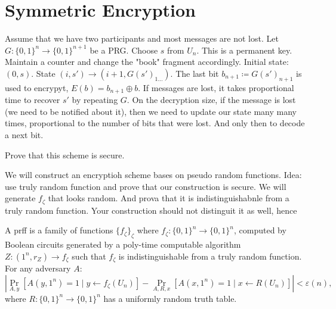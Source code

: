 

\section{Symmetric Encryption}

Assume that we have two participants and most messages are not lost.
Let $G \colon \{0, 1\}^{n} \to  \{0, 1\}^{n + 1}$ be a PRG.
Choose $s$ from $U_n$.
This is a permanent key.
Maintain a counter and change the "book" fragment accordingly.
Initial state:  $(0, s)$.
State $(i, s') \to (i + 1, G(s')_{1\ldots })$.
The last bit $b_{n + 1} \coloneqq G(s')_{n + 1}$ is used to encrypyt, $E(b) = b_{n + 1} \oplus b$.
If messages are lost, it takes proportional time to recover $s'$ by repeating  $G$.
On the decryption size, if the message is lost (we need to be notified about it), then we need to update our state many many times, proportional to the number of bits that were lost.
And only then to decode a next bit.
 \begin{exercise}
	Prove that this scheme is secure.
\end{exercise}

We will construct an encryptioh scheme bases on pseudo random functions.
Idea: use truly random function and prove that our construction is secure.
We will generate $f_{\zeta}$ that looks random.
And prova that it is indistinguishabnle from a truly random function.
Your construction should not distinguit it as well, hence 

\begin{definition}
	A prff is a family of functions $\{f_{\zeta}\}_{\zeta} $ where $f_{\zeta}  \colon \{0, 1\}^{n}\to \{0, 1\}^{n}$, computed by Boolean circuits generated by a poly-time computable algorithm $Z  \colon (1^{n}, r_Z) \to  f_{\zeta}$ such that $f_{\zeta}$ is indistinguishable from a truly random function.
	For any adversary $A$:
	 \[
		 |\Pr_{A, y}[A(y, 1^{n}) = 1  \mid y \gets f_{\zeta}(U_n)] - \Pr_{A, R, x}[A(x, 1^{n}) = 1  \mid x \gets R(U_n)]| < \varepsilon(n),
	\] where $R \colon \{0, 1\}^{n} \to  \{0, 1\}^{n}$ has a uniformly random truth table.
\end{definition}

